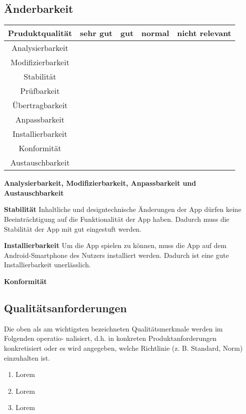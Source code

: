 \documentclass[parskip=full]{scrartcl}
\begin{document}
\subsection{Änderbarkeit}
\begin{tabular}{| c | c | c | c | c |}
    \hline
    \textbf{Pruduktqualität} & \textbf{sehr gut} & \textbf{gut} & \textbf{normal} & \textbf{nicht relevant} \\ \hline
    Analysierbarkeit &  &  &  & \\ \hline
    Modifizierbarkeit &  &  &  & \\ \hline
    Stabilität &  &  &  &  \\ \hline
    Prüfbarkeit &  &  &  &  \\ \hline
    Übertragbarkeit &  &  &  &  \\ \hline
    Anpassbarkeit &  &  &  &  \\ \hline
    Installierbarkeit &  &  &  &  \\ \hline
    Konformität &  &  &  &  \\ \hline
    Austauschbarkeit &  &  &  &  \\ \hline
\end{tabular}

\textbf{Analysierbarkeit, Modifizierbarkeit, Anpassbarkeit und Austauschbarkeit}

\textbf{Stabilität}
Inhaltliche und designtechnische Änderungen der App dürfen keine Beeinträchtigung auf die Funktionalität der App haben.
Dadurch muss die Stabilität der App mit gut eingestuft werden.

\textbf{Installierbarkeit}
Um die App spielen zu können, muss die App auf dem Android-Smartphone des Nutzers installiert werden.
Dadurch ist eine gute Installierbarkeit unerlässlich.

\textbf{Konformität}


\subsection{Qualitätsanforderungen}
Die oben als am wichtigsten bezeichneten Qualitätsmerkmale werden im Folgenden operatio- nalisiert, d.h. in konkreten Produktanforderungen konkretisiert oder es wird angegeben, welche Richtlinie (z. B. Standard, Norm) einzuhalten ist.

\begin{enumerate}[start=1,label={$\langle$\bfseries Q\arabic*$\rangle$}, leftmargin = 5em, itemsep=4pt, parsep=4pt]
    \item Lorem
    \item Lorem
    \item Lorem
\end{enumerate}
\end{document}
